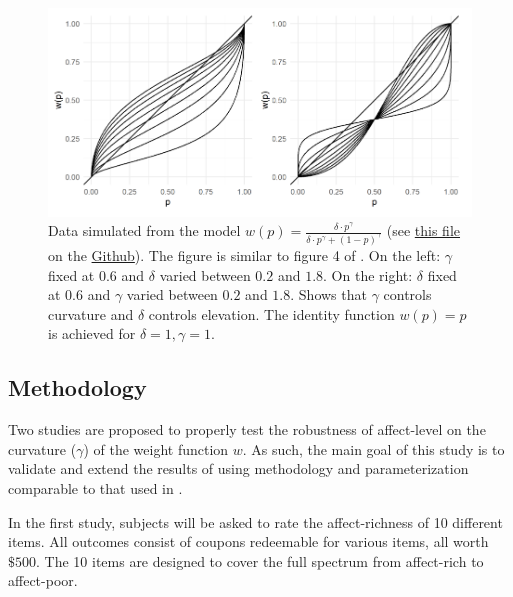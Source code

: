 \documentclass[12pt]{article}
\begin{document}
\begin{figure}[H]
	\includegraphics[width = \linewidth]{../Figures/Fig2.png}
	\caption{Data simulated from the model
		$w(p) = \frac{\delta \cdot p^{\gamma}}
	{\delta \cdot p^{\gamma} +
	(1-p)^{\gamma}}$ (see
		\href{https://github.com/victor-m-p/BayesianDecisionWeights/blob/main/Code/0_visualize_parameters.Rmd}
		{this file} on the
		\href{https://github.com/victor-m-p/BayesianDecisionWeights}{Github}). The figure
	is similar to figure 4
	of \textcite{gonzalez1999shape}.
	On the left: $\gamma$ fixed at $0.6$
	and $\delta$ varied between $0.2$ and $1.8$.
	On the right: $\delta$ fixed at $0.6$
	and $\gamma$ varied between $0.2$ and $1.8$.
	Shows that $\gamma$  controls
	curvature and $\delta$ controls
	elevation. The identity function $w(p) = p$
	is achieved for $\delta = 1, \gamma = 1$.}
\end{figure}

\subsection{Methodology}

Two studies are proposed to
properly test the robustness
of affect-level on the
curvature ($\gamma$) of the
weight function $w$. As such, the
main goal of this study is to validate
and extend the results of
\autocite{rottenstreich2001money}
using methodology and parameterization
comparable to that used in
\autocite{gonzalez1999shape}.

\vspace{3mm}

In the first study, subjects will be asked to
rate the affect-richness of 10 different
items.
All outcomes
consist of coupons redeemable
for various items, all worth $\$500$.
The 10 items are designed to cover the
full spectrum from affect-rich to
affect-poor.

\vspace{3mm}
\end{document}
